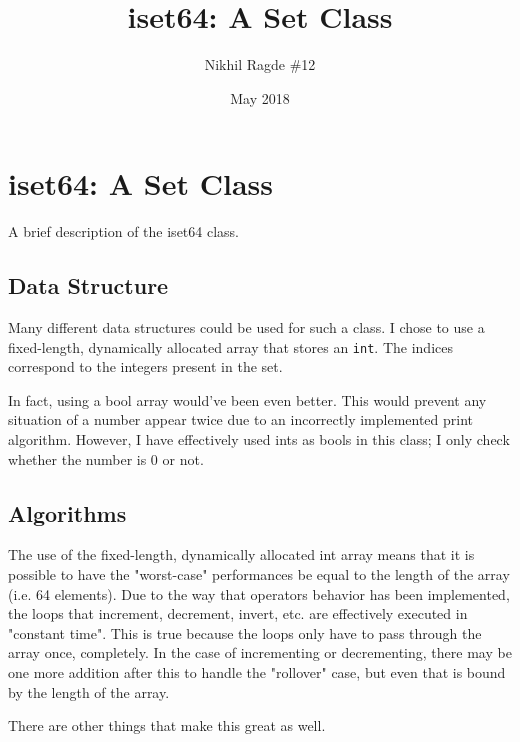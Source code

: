 \documentclass[12pt, letterpaper]{article}
\title{iset64: A Set Class}
\author{Nikhil Ragde \#12}
\date{May 2018}
\begin{document}
\maketitle
\section*{iset64: A Set Class}
A brief description of the iset64 class.
\setcounter{section}{1}
\subsection{Data Structure}
Many different data structures could be used for such a class. I chose to use a fixed-length, dynamically allocated array that stores an \texttt{int}. The indices correspond to the integers present in the set.

In fact, using a bool array would've been even better. This would prevent any situation of a number appear twice due to an incorrectly implemented print algorithm. However, I have effectively used ints as bools in this class; I only check whether the number is 0 or not.

\subsection{Algorithms}
The use of the fixed-length, dynamically allocated int array means that it is possible to have the "worst-case" performances be equal to the length of the array (i.e. 64 elements). Due to the way that operators behavior has been implemented, the loops that increment, decrement, invert, etc. are effectively executed in "constant time". This is true because the loops only have to pass through the array once, completely. In the case of incrementing or decrementing, there may be one more addition after this to handle the "rollover" case, but even that is bound by the length of the array.

There are other things that make this great as well.
\end{document}

